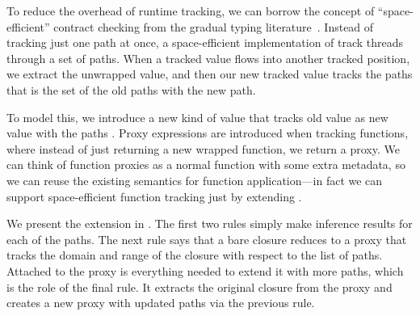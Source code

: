 \label{infer:sec:space-efficient-tracking}

To reduce the overhead of runtime tracking, we can borrow
the concept of ``space-efficient'' contract checking from
the gradual typing literature~.
%
Instead of tracking just one path at once, a space-efficient
implementation of track threads through a set of paths.
When a tracked value flows into another tracked position,
we extract the unwrapped value, and then our new tracked value
tracks the paths that is the set of the old paths with the new path.

To model this, we introduce a new kind of value \ProxyV{\val{}}{\closure{\e{}}{\openv{}}}{\ova{\inferpath{}}}
that tracks old value \val{} as new value \closure{\e{}}{\openv{}} with the paths \ova{\inferpath{}}.
Proxy expressions are introduced when tracking functions, where instead of just returning
a new wrapped function, we return a proxy.
We can think of function proxies as a normal function with some extra metadata, so we
can reuse the existing semantics for function application---in fact we
can support space-efficient function tracking just by extending \trackEOp{}.

We present the extension in .
The first two \trackEOp{} rules simply make inference
results for each of the paths.
The next rule says that a bare closure
reduces to a proxy that tracks the domain and range
of the closure with respect to the list of paths.
Attached to the proxy is everything needed to extend
it with more paths, which is the role of the
final rule. It extracts the original closure from the
proxy and creates a new proxy with updated paths
via the previous rule.

